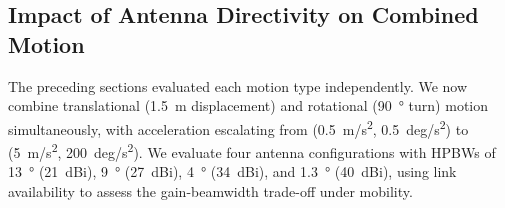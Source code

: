 \documentclass[fleqn,10pt]{wlscirep}
\begin{document}
\subsection*{Impact of Antenna Directivity on Combined Motion}

The preceding sections evaluated each motion type independently. We now combine translational (\SI{1.5}{m} displacement) and rotational (\SI{90}{\degree} turn) motion simultaneously, with acceleration escalating from (\SI{0.5}{m/s^2}, \SI{0.5}{deg/s^2}) to (\SI{5}{m/s^2}, \SI{200}{deg/s^2}). We evaluate four antenna configurations with HPBWs of \SI{13}{\degree} (\SI{21}{dBi}), \SI{9}{\degree} (\SI{27}{dBi}), \SI{4}{\degree} (\SI{34}{dBi}), and \SI{1.3}{\degree} (\SI{40}{dBi}), using link availability to assess the gain-beamwidth trade-off under mobility.
\end{document}
